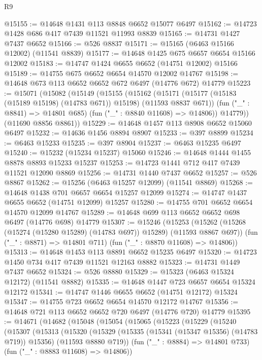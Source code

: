 \begin{lexlean}{R9}
\begin{coremodule}
@15155 := @14648 @1431 @113 @8848 @6652 @15077 @6497
@15162 := @14723 @1428 @686 @417 @7439 @11521 @11993 @8839
@15165 := @14731 @1427 @7437 @6652
@15166 := @526 @8837
@15171 := @15165 (@6463 @15166 @12002) (@11541 @8839)
@15177 := @14648 @1425 @675 @6657 @6654 @15166 @12002
@15183 := @14747 @1424 @6655 @6652 (@14751 @12002) @15166
@15189 := @14755 @675 @6652 @6654 @14570 @12002 @14767
@15198 := @14648 @673 @113 @6652 @6652 @672 @6497 (@14776 @672) @14779
@15223 := @15071
    (@15082
      (@15149
        (@15155
          (@15162
            (@15171 (@15177 (@15183 (@15189 @15198) (@14783 @671)) @15198) (@11593 @8837 @671))
            (fun ("_" : @8841) => @14801 @685)
            (fun ("_" : @8840 @11608) => @14806))
          @14779))
      (@11690 @8856 @8861))
@15229 := @14648 @1457 @113 @8908 @6652 @15060 @6497
@15232 := @14636 @1456 @8894 @8907
@15233 := @397 @8899
@15234 := @6463 @15233
@15235 := @397 @8904
@15237 := @6463 @15235 @6497
@15240 := @15232 (@15234 @15237) @15060
@15246 := @14648 @1444 @1455 @8878 @8893 @15233 @15237
@15253 := @14723 @1441 @712 @417 @7439 @11521 @12090 @8869
@15256 := @14731 @1440 @7437 @6652
@15257 := @526 @8867
@15262 := @15256 (@6463 @15257 @12099) (@11541 @8869)
@15268 := @14648 @1438 @701 @6657 @6654 @15257 @12099
@15274 := @14747 @1437 @6655 @6652 (@14751 @12099) @15257
@15280 := @14755 @701 @6652 @6654 @14570 @12099 @14767
@15289 := @14648 @699 @113 @6652 @6652 @698 @6497 (@14776 @698) @14779
@15307 := @15246
    (@15253
      (@15262 (@15268 (@15274 (@15280 @15289) (@14783 @697)) @15289) (@11593 @8867 @697))
      (fun ("_" : @8871) => @14801 @711)
      (fun ("_" : @8870 @11608) => @14806))
@15313 := @14648 @1453 @113 @8891 @6652 @15235 @6497
@15320 := @14723 @1450 @734 @417 @7439 @11521 @12163 @8882
@15323 := @14731 @1449 @7437 @6652
@15324 := @526 @8880
@15329 := @15323 (@6463 @15324 @12172) (@11541 @8882)
@15335 := @14648 @1447 @723 @6657 @6654 @15324 @12172
@15341 := @14747 @1446 @6655 @6652 (@14751 @12172) @15324
@15347 := @14755 @723 @6652 @6654 @14570 @12172 @14767
@15356 := @14648 @721 @113 @6652 @6652 @720 @6497 (@14776 @720) @14779
@15395 := @14671
    (@14682
      (@15048
        (@15054
          (@15065
            (@15223
              (@15229
                (@15240
                  (@15307
                    (@15313
                      (@15320
                        (@15329
                          (@15335 (@15341 (@15347 @15356) (@14783 @719)) @15356)
                          (@11593 @8880 @719))
                        (fun ("_" : @8884) => @14801 @733)
                        (fun ("_" : @8883 @11608) => @14806))

\end{coremodule}
\end{lexlean}
